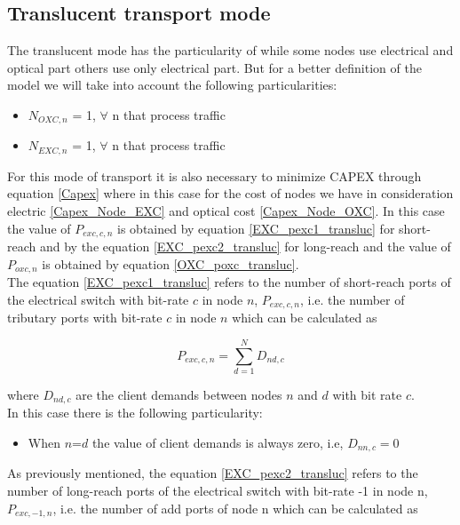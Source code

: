 
\subsection{Translucent transport mode}\label{ILP_Transluc_Mode}

The translucent mode has the particularity of while some nodes use electrical and optical part others use only electrical part. But for a better definition of the model we will take into account the following particularities:
\begin{itemize}
  \item $N_{OXC,n}$ = 1, \quad $\forall$ n that process traffic
  \item $N_{EXC,n}$ = 1, \quad $\forall$ n that process traffic
\end{itemize}

For this mode of transport it is also necessary to minimize CAPEX through equation \ref{Capex} where in this case for the cost of nodes we have in consideration electric \ref{Capex_Node_EXC} and optical cost \ref{Capex_Node_OXC}. In this case the value of $P_{exc,c,n}$ is obtained by equation \ref{EXC_pexc1_transluc} for short-reach and by the equation \ref{EXC_pexc2_transluc} for long-reach and the value of $P_{oxc,n}$ is obtained by equation \ref{OXC_poxc_transluc}.\\

The equation \ref{EXC_pexc1_transluc} refers to the number of short-reach ports of the electrical switch with bit-rate $c$ in node $n$, $P_{exc,c,n}$, i.e. the number of tributary ports with bit-rate $c$ in node $n$ which can be calculated as

\begin{equation}
P_{exc,c,n} = \sum_{d=1}^{N} D_{nd,c}
\label{EXC_pexc1_transluc}
\end{equation}

\noindent
where $D_{nd,c}$ are the client demands between nodes $n$ and $d$ with bit rate $c$.\\

In this case there is the following particularity:
\begin{itemize}
  \item When $n$=$d$ the value of client demands is always zero, i.e, $D_{nn,c}=0$
\end{itemize}

As previously mentioned, the equation \ref{EXC_pexc2_transluc} refers to the number of long-reach ports of the electrical switch with bit-rate -1 in node n, $P_{exc,-1,n}$, i.e. the number of add ports of node n which can be calculated as

